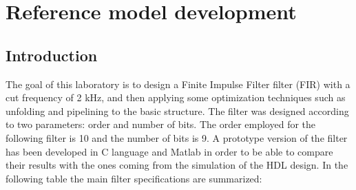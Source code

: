 %

\chapter{Reference model development}
\label{chap1}
\graphicspath{ {./chapters/chap1images/} }
\section{Introduction}

The goal of this laboratory is to design a Finite Impulse Filter filter (FIR) with a cut frequency of 2 kHz, and then applying some optimization 
techniques such as unfolding and pipelining to the basic structure.
The filter was designed according to two parameters: order and number of bits. The order employed for the following filter
is 10 and the number of bits is 9.
A prototype version of the filter has been developed in C language and Matlab in order to be able to compare their results with the
ones coming from the simulation of the HDL design.
In the following table the main filter specifications are summarized:

%

